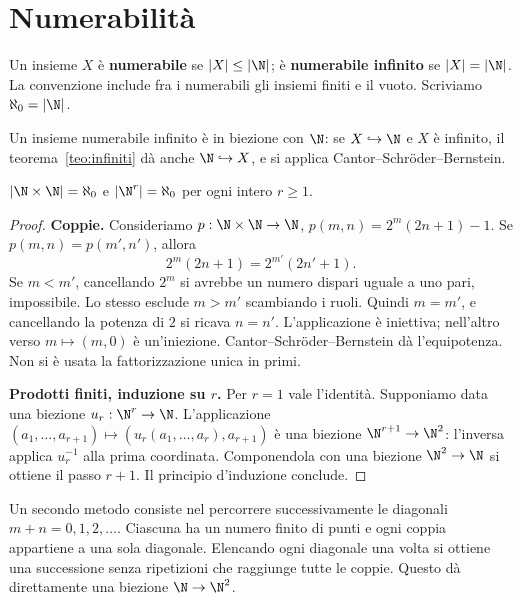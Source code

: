 \section{Numerabilità}
\begin{definizione}
Un insieme $X$ è \textbf{numerabile} se $|X|\le|\N|$; è \textbf{numerabile infinito} se $|X|=|\N|$. La convenzione include fra i numerabili gli insiemi finiti e il vuoto. Scriviamo $\aleph_0=|\N|$.
\end{definizione}

Un insieme numerabile infinito è in biezione con $\N$: se $X\hookrightarrow\N$ e $X$ è infinito, il teorema~\ref{teo:infiniti} dà anche $\N\hookrightarrow X$, e si applica Cantor--Schröder--Bernstein.

\begin{proposizione}
$|\N\times\N|=\aleph_0$ e $|\N^r|=\aleph_0$ per ogni intero $r\ge1$.
\end{proposizione}
\begin{proof}
\textbf{Coppie.} Consideriamo $p:\N\times\N\to\N$, $p(m,n)=2^m(2n+1)-1$. Se $p(m,n)=p(m',n')$, allora
\[
2^m(2n+1)=2^{m'}(2n'+1).
\]
Se $m<m'$, cancellando $2^m$ si avrebbe un numero dispari uguale a uno pari, impossibile. Lo stesso esclude $m>m'$ scambiando i ruoli. Quindi $m=m'$, e cancellando la potenza di $2$ si ricava $n=n'$. L'applicazione è iniettiva; nell'altro verso $m\mapsto(m,0)$ è un'iniezione. Cantor--Schröder--Bernstein dà l'equipotenza. Non si è usata la fattorizzazione unica in primi.

\textbf{Prodotti finiti, induzione su $r$.} Per $r=1$ vale l'identità. Supponiamo data una biezione $u_r:\N^r\to\N$. L'applicazione $(a_1,\ldots,a_{r+1})\mapsto(u_r(a_1,\ldots,a_r),a_{r+1})$ è una biezione $\N^{r+1}\to\N^2$: l'inversa applica $u_r^{-1}$ alla prima coordinata. Componendola con una biezione $\N^2\to\N$ si ottiene il passo $r+1$. Il principio d'induzione conclude.
\end{proof}

\begin{osservazione}
Un secondo metodo consiste nel percorrere successivamente le diagonali $m+n=0,1,2,\ldots$. Ciascuna ha un numero finito di punti e ogni coppia appartiene a una sola diagonale. Elencando ogni diagonale una volta si ottiene una successione senza ripetizioni che raggiunge tutte le coppie. Questo dà direttamente una biezione $\N\to\N^2$.
\end{osservazione}

\begin{schema}
\end{schema}


